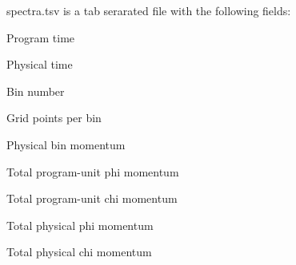 spectra.tsv is a tab serarated file with the following fields:

\begin{DoxyItemize}
\item Program time \item Physical time \item Bin number \item Grid points per bin \item Physical bin momentum \item Total program-\/unit phi momentum \item Total program-\/unit chi momentum \item Total physical phi momentum \item Total physical chi momentum \end{DoxyItemize}
